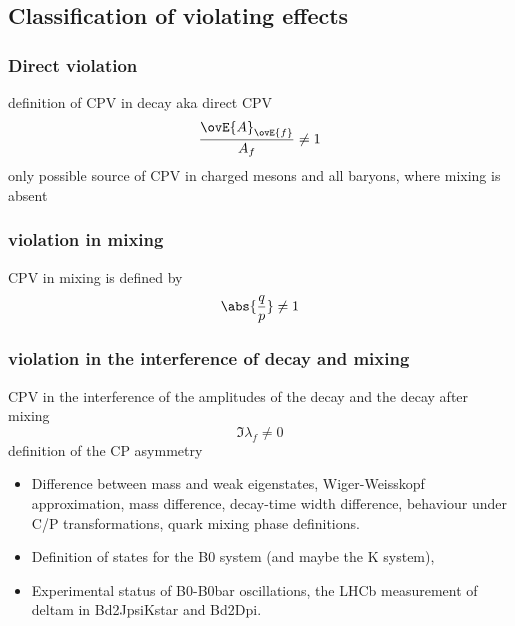 \subsection[Classification of \CP violating effects]{Classification of \CPbfsf violating effects}
\label{sec:cpv_theory:flavour_physics:cpv_classification}

\subsubsection[Direct \CP violation]{Direct \CPbfsf violation}
\label{sec:cpv_theory:flavour_physics:cpv_classification:direct}

definition of CPV in decay aka direct CPV
%
\begin{equation}
  \frac{\ovE{A}_{\ovE{f}}}{A_f} \neq 1
\end{equation}
%
only possible source of CPV in charged mesons and all baryons, where mixing is absent

\subsubsection[\CP violation in mixing]{\CPbfsf violation in mixing}
\label{sec:cpv_theory:flavour_physics:cpv_classification:mixing}

CPV in mixing is defined by
%
\begin{equation}
  \abs{\frac{q}{p}} \neq 1
\end{equation}

\subsubsection[\CP violation in the interference of decay and mixing]{\CPbfsf violation in the interference of decay and mixing}
\label{sec:cpv_theory:flavour_physics:cpv_classification:interference}

CPV in the interference of the amplitudes of the decay and the decay after mixing
%
\begin{equation}
  \Im \lambda_f \neq 0   
\end{equation}
%
definition of the CP asymmetry


\clearpage
\begin{itemize}
  \item Difference between mass and weak eigenstates, Wiger-Weisskopf approximation, mass difference, decay-time width difference, behaviour under C/P transformations, quark mixing phase definitions.
  \item Definition of states for the B0 system (and maybe the K system), 
  \item Experimental status of B0-B0bar oscillations, the LHCb measurement of deltam in Bd2JpsiKstar and Bd2Dpi.
\end{itemize}

